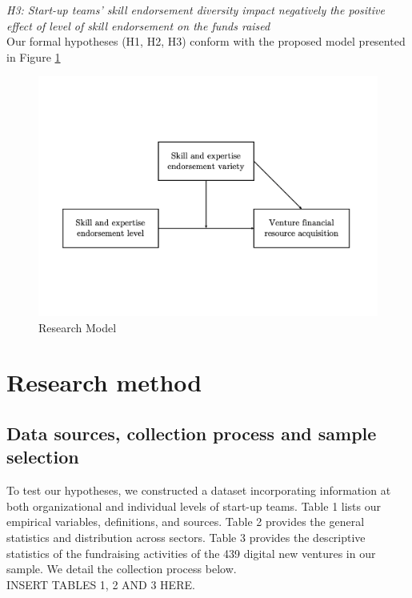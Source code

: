 \documentclass[12pt]{article}
\begin{document}
\noindent \textit{H3: Start-up teams' skill endorsement diversity impact negatively the positive effect of level of skill endorsement on the funds raised} \\

Our formal hypotheses (H1, H2, H3) conform with the proposed model presented in Figure \ref{Figure1}

\begin{figure}[!b]
  \includegraphics[width=\linewidth, scale=0.5]{model.pdf}
  \caption{Research Model}
  \label{Figure1}
\end{figure}

\section{Research method}

\subsection{Data sources, collection process and sample selection}

To test our hypotheses, we constructed a dataset incorporating information at both organizational and individual levels of start-up teams. Table 1\label{table1} lists our empirical variables, definitions, and sources. Table 2\label{table2} provides the general statistics and distribution across sectors. Table 3\label{table3} provides the descriptive statistics of the fundraising activities of the 439 digital new ventures in our sample. We detail the collection process below. \\

INSERT TABLES 1, 2 AND 3 HERE. \\
\end{document}
